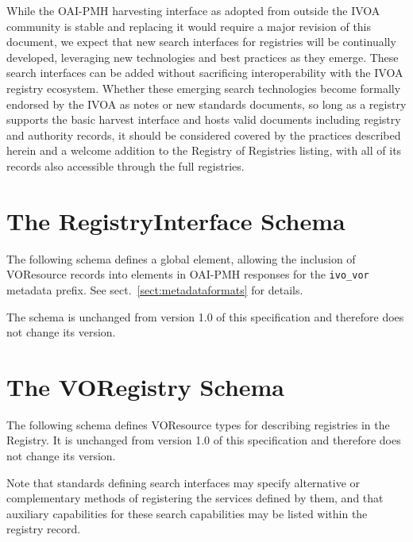 \documentclass{ivoa}
\begin{document}
While the OAI-PMH harvesting interface as adopted from outside the IVOA 
community is stable and replacing it would require a major revision
of this document, we expect that new search interfaces for registries will
be continually developed, leveraging new technologies and best practices
as they emerge. These search interfaces can be added without sacrificing 
interoperability with the IVOA registry ecosystem.  Whether these emerging 
search technologies become formally endorsed by the IVOA as notes or new 
standards documents, so long as a registry supports the basic harvest interface 
and hosts valid  documents including registry and authority 
records, it should be considered covered by the practices described herein and 
a welcome addition to the Registry of Registries listing, with all of its 
records also accessible through the full registries.

\appendix

\section{The RegistryInterface Schema}
\label{app:rischema}

The following schema defines a global element, allowing the inclusion of
VOResource records into  elements in OAI-PMH
responses for the \texttt{ivo\_vor} metadata prefix.  See 
sect.~\ref{sect:metadataformats} for details.

The schema is unchanged from version 1.0 of this specification and
therefore does not change its version.



\section{The VORegistry Schema}
\label{app:vgschema}

The following schema defines VOResource types for describing registries
in the Registry.  It is unchanged from version 1.0 of this specification
and therefore does not change its version.

Note that standards defining search interfaces may specify alternative
or complementary methods of registering the services defined by them,
and that auxiliary capabilities for these search capabilities may be
listed within the registry record.


\end{document}
